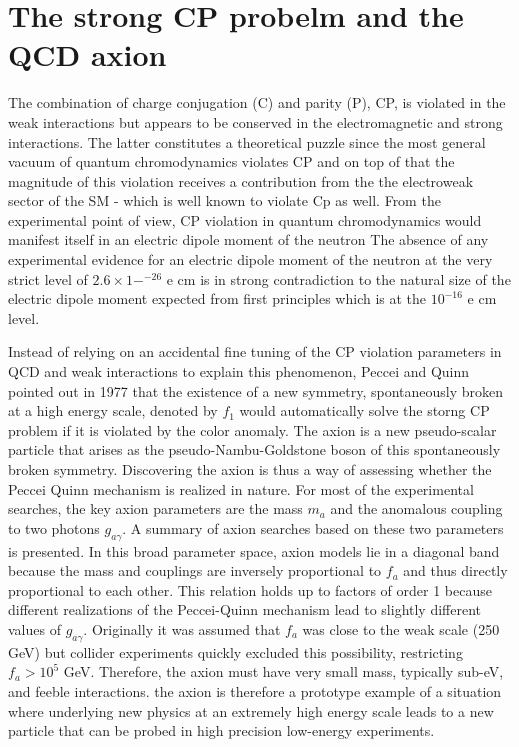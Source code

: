 \documentclass[12pt, twoside]{book}
\begin{document}
\section{The strong CP probelm and the QCD axion}
The combination of charge conjugation (C) and parity (P), CP, is violated in the weak interactions but appears to be conserved in the electromagnetic and strong interactions. The latter constitutes a theoretical puzzle since the most general vacuum of quantum chromodynamics violates CP and on top of that the magnitude of this violation receives a contribution from the the electroweak sector of the SM - which is well known to violate Cp as well. From the experimental point of view, CP violation in quantum chromodynamics would manifest itself in an electric dipole moment of the neutron The absence of any experimental evidence for an electric dipole moment of the neutron at the very strict level of $2.6\times1-^{-26}$ e cm is in strong contradiction to the natural size of the electric dipole moment expected from first principles which is at the $10^{-16}$ e cm level.

Instead of relying on an accidental fine tuning of the CP violation parameters in QCD and weak interactions to explain this phenomenon, Peccei and Quinn pointed out in  1977 that the existence of a new symmetry, spontaneously broken at a high energy scale, denoted by $f_1$ would automatically solve the storng CP problem if it is violated by the color anomaly. The axion is a new pseudo-scalar particle that arises as the pseudo-Nambu-Goldstone boson of this spontaneously broken symmetry. Discovering the axion is thus a way of assessing whether the Peccei Quinn mechanism is realized in nature. For most of the experimental searches, the key axion parameters are the mass $m_a$ and the anomalous coupling to two photons $g_{a\gamma}$. A summary of axion searches based on these two parameters is presented. In this broad parameter space, axion models lie in a diagonal band because the mass and couplings are inversely proportional to $f_a$ and thus directly proportional to each other. This relation holds up to factors of order 1 because different realizations of the Peccei-Quinn mechanism lead to slightly different values of $g_{a\gamma}$.
Originally it was assumed that $f_a$ was close to the weak scale (250 GeV) but collider experiments quickly excluded this possibility, restricting $f_a > 10^5$ GeV. Therefore, the axion must have very small mass, typically sub-eV, and feeble interactions. the axion is therefore a prototype example of a situation where underlying new physics at an extremely high energy scale leads to a new particle that can be probed in high precision low-energy experiments.
\end{document}

